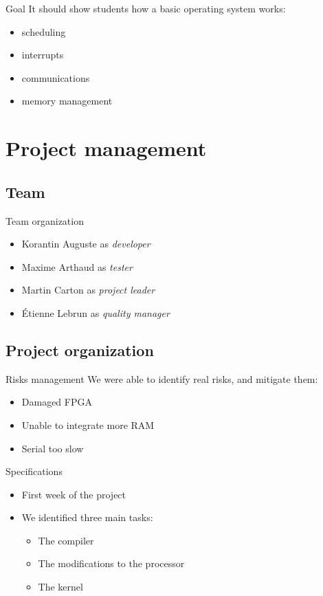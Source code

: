 \documentclass{beamer}
\begin{document}
    \begin{frame}{Goal}
      It should show students how a basic operating system works:
        \begin{itemize}
          \item scheduling
          \item interrupts
          \item communications
          \item memory management
        \end{itemize}
    \end{frame}

  \section{Project management}
    \subsection{Team}
      \begin{frame}{Team organization}
        \begin{itemize}
          \item Korantin Auguste as \textit{developer}
          \item Maxime Arthaud as \textit{tester}
          \item Martin Carton as \textit{project leader}
          \item Étienne Lebrun as \textit{quality manager}
        \end{itemize}
      \end{frame}

    \subsection{Project organization}
      \begin{frame}{Risks management}
        We were able to identify real risks, and mitigate them:
        \begin{itemize}
          \item Damaged FPGA
          \item Unable to integrate more RAM
          \item Serial too slow
        \end{itemize}
      \end{frame}

      \begin{frame}{Specifications}
        \begin{itemize}
          \item First week of the project
          \item We identified three main tasks:
            \begin{itemize}
              \item The compiler
              \item The modifications to the processor
              \item The kernel
            \end{itemize}
          \end{itemize}
      \end{frame}
\end{document}
